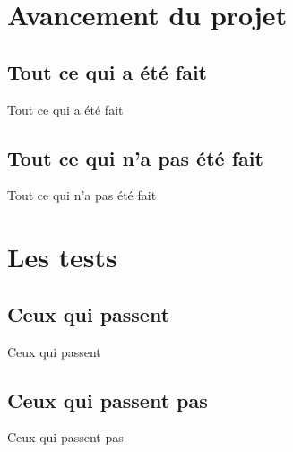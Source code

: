 \documentclass[aspectratio=169]{beamer}
\begin{document}
\section{Avancement du projet}
\subsection{Tout ce qui a été fait}
\begin{frame}{Tout ce qui a été fait}
 
\end{frame}

\subsection{Tout ce qui n'a pas été fait}
\begin{frame}{Tout ce qui n'a pas été fait}
 
\end{frame}

\section{Les tests}
\subsection{Ceux qui passent}
\begin{frame}{Ceux qui passent}
 
\end{frame}

\subsection{Ceux qui passent pas}
\begin{frame}{Ceux qui passent pas}
 
\end{frame}
\end{document}
